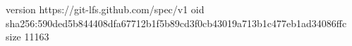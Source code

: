 version https://git-lfs.github.com/spec/v1
oid sha256:590ded5b844408dfa67712b1f5b89cd3f0cb43019a713b1c477eb1ad34086ffc
size 11163
